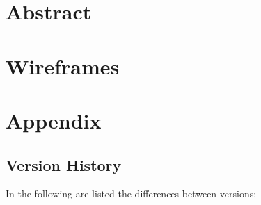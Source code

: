 \documentclass{../Common/Structure/doc_pdf}
\begin{document}
\titleToc

\chapter{Abstract}
\thispagestyle{fancy}

\chapter{Wireframes}

\appendix
\chapter{Appendix}
\section{Version History}
In the following are listed the differences between versions:
\end{document}
